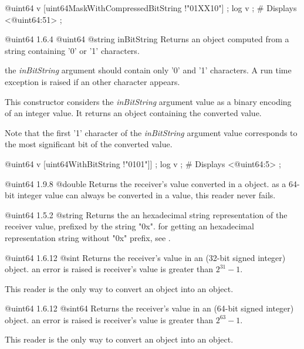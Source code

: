 \exempleDeuxLignes
{}
{@uint64 v [uint64MaskWithCompressedBitString !"01XX10"] ;}
{log v ; \# Displays <@uint64:51> ;}



{@uint64}
{1.6.4}
{@uint64}
{@string inBitString}
{Returns an  object computed from a string containing '0' or '1' characters.}
{the \emph{inBitString} argument should contain only '0' and '1' characters. A run time exception is raised if an other character appears.

This constructor considers the \emph{inBitString} argument value as a binary encoding of an integer value. It returns an  object containing the converted value.

Note that the first '1' character of the \emph{inBitString} argument value corresponds to the most significant bit of the converted value.}

\exempleDeuxLignes
{}
{@uint64 v [uint64WithBitString !"0101"]] ;}
{log v ; \# Displays <@uint64:5> ;}




{@uint64}
{1.9.8}
{@double}
{Returns the receiver's value converted in a  object.}
{as a 64-bit integer value can always be converted in a  value, this reader never fails.}



{@uint64}
{1.5.2}
{@string}
{Returns the an hexadecimal string representation of the receiver value, prefixed by the string "0x".}
{for getting an hexadecimal representation string without "0x" prefix, see .}





{@uint64}
{1.6.12}
{@sint}
{Returns the receiver's value in an  (32-bit signed integer) object.}
{an error is raised is receiver's value is greater than $2^{31}-1$.}

This reader is the only way to convert an  object into an  object.




{@uint64}
{1.6.12}
{@sint64}
{Returns the receiver's value in an  (64-bit signed integer) object.}
{an error is raised is receiver's value is greater than $2^{63}-1$.}

This reader is the only way to convert an  object into an  object.


